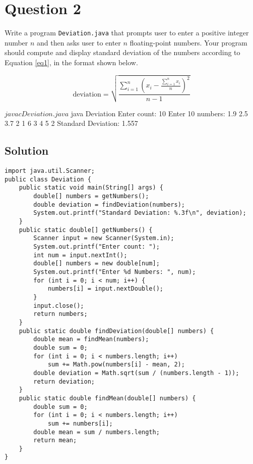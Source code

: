 \documentclass[12pt,letterpaper,twoside]{article}
\begin{document}
\section*{Question 2}

Write a program \texttt{Deviation.java} that prompts user to enter a positive integer number $n$ and then asks user to enter $n$ floating-point numbers.
Your program should compute and display standard deviation of the numbers according to Equation \ref{eq1}, in the format shown below.

\begin{equation}
\text{deviation} = \sqrt{\frac{\sum_{i = 1}^{n} \left( x_i - \frac{\sum_{i = 1}^{n} x_i}{n} \right)^2 }{n - 1}}
\label{eq1}
\end{equation}

\begin{terminal}
$ javac Deviation.java
$ java Deviation
Enter count: 10
Enter 10 numbers: 1.9 2.5 3.7 2 1 6 3 4 5 2
Standard Deviation: 1.557
\end{terminal}

\newpage

\subsection*{Solution}

\lstset{language=Java,tabsize=4}
\begin{lstlisting}
import java.util.Scanner;
public class Deviation {
	public static void main(String[] args) {
		double[] numbers = getNumbers();
		double deviation = findDeviation(numbers);
		System.out.printf("Standard Deviation: %.3f\n", deviation);
	}
	public static double[] getNumbers() {
		Scanner input = new Scanner(System.in);
		System.out.printf("Enter count: ");
		int num = input.nextInt();
		double[] numbers = new double[num];
		System.out.printf("Enter %d Numbers: ", num);
		for (int i = 0; i < num; i++) {
			numbers[i] = input.nextDouble();
		}
		input.close();
		return numbers;
	}
	public static double findDeviation(double[] numbers) {
		double mean = findMean(numbers);
		double sum = 0;
		for (int i = 0; i < numbers.length; i++)
			sum += Math.pow(numbers[i] - mean, 2);
		double deviation = Math.sqrt(sum / (numbers.length - 1));
		return deviation;
	}
	public static double findMean(double[] numbers) {
		double sum = 0;
		for (int i = 0; i < numbers.length; i++)
			sum += numbers[i];
		double mean = sum / numbers.length;
		return mean;
	}
}
\end{lstlisting}
\end{document}
